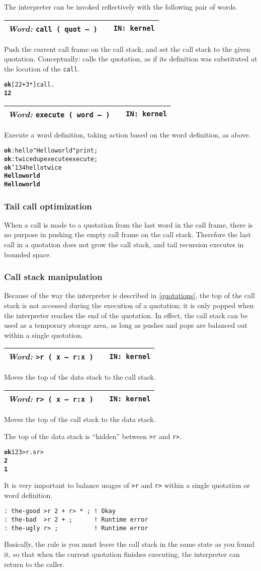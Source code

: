 \documentclass{report}
\newcommand{\bs}{\char'134}
\newcommand{\ordinaryword}[3]{\index{#1}
\emph{Word:} \texttt{#2} &&\texttt{IN: #3}}
\newcommand{\wordtable}[1]{

\begin{tabularx}{12cm}[t]{lXr}
\hline
#1\\
\hline
\end{tabularx}

}
\begin{document}
The interpreter can be invoked reflectively with the following pair of words.
\wordtable{
\ordinaryword{call}{call ( quot -- )}{kernel}
}
Push the current call frame on the call stack, and set the call stack to the given quotation. Conceptually: calls the quotation, as if its definition was substituted at the location of the \texttt{call}.
\begin{alltt}
\textbf{ok} [ 2 2 + 3 * ] call .
\textbf{12}
\end{alltt}
\wordtable{
\ordinaryword{execute}{execute ( word -- )}{kernel}
}
Execute a word definition, taking action based on the word definition, as above.
\begin{alltt}
\textbf{ok} : hello "Hello world" print ;
\textbf{ok} : twice dup execute execute ;
\textbf{ok} \bs hello twice
\textbf{Hello world}
\textbf{Hello world}
\end{alltt}

\subsubsection{Tail call optimization}

\newcommand{\tailglos}{\glossary{
name=tail call,
description=the last call in a quotation}
\glossary{
name=tail call optimization,
description=the elimination of call stack pushes when making a tail call}}

When a call is made to a quotation from the last word in the call frame, there is no
purpose in pushing the empty call frame on the call stack. Therefore the last call in a quotation does not grow the call stack, and tail recursion executes in bounded space.

\subsubsection{Call stack manipulation}

Because of the way the interpreter is described in \ref{quotations}, the top of the call stack is not accessed during the execution of a quotation; it is only popped when the interpreter reaches the end of the quotation. In effect, the call stack can be used as a temporary storage area, as long as pushes and pops are balanced out within a single quotation.
\wordtable{
\ordinaryword{>r}{>r ( x -- r:x )}{kernel}
}
Moves the top of the data stack to the call stack.
\wordtable{
\ordinaryword{r>}{r> ( x -- r:x )}{kernel}
}
Moves the top of the call stack to the data stack.

The top of the data stack is ``hidden'' between \texttt{>r} and \texttt{r>}.
\begin{alltt}
\textbf{ok} 1 2 3 >r .s r>
\textbf{2
1}
\end{alltt}
It is very important to balance usages of \texttt{>r} and \texttt{r>} within a single quotation or word definition.
\begin{verbatim}
: the-good >r 2 + r> * ; ! Okay
: the-bad  >r 2 + ;      ! Runtime error
: the-ugly r> ;          ! Runtime error
\end{verbatim}
Basically, the rule is you must leave the call stack in the same state as you found it, so that when the current quotation finishes executing, the interpreter can return to the caller.
\end{document}
